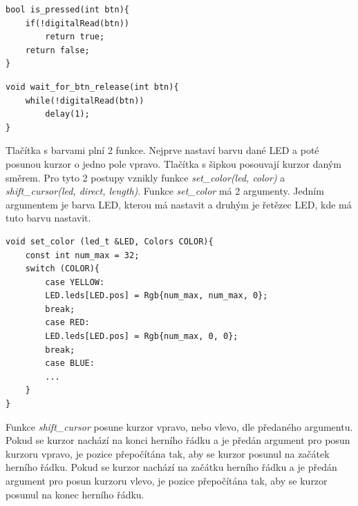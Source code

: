 \begin{minipage}{\linewidth}
\begin{lstlisting}[frame=single,numbers=right,caption={Funkce pro detekci stisku tlačítka.},label=lst:priklad.vypis.kodu.C,basicstyle=\ttfamily\small, keywordstyle=\color{black}\bfseries\underbar,]
bool is_pressed(int btn){
    if(!digitalRead(btn))
        return true;
    return false;
}
\end{lstlisting}
\end{minipage}

\begin{minipage}{\linewidth}
\begin{lstlisting}[frame=single,numbers=right,caption={Funkce čekající na puštění tlačítka.},label=lst:priklad.vypis.kodu.C,basicstyle=\ttfamily\small, keywordstyle=\color{black}\bfseries\underbar,]
void wait_for_btn_release(int btn){
    while(!digitalRead(btn))
        delay(1);
}
\end{lstlisting}
\end{minipage} 

Tlačítka s barvami plní 2 funkce. Nejprve nastaví barvu dané LED a poté posunou kurzor o jedno pole vpravo. Tlačítka s šipkou posouvají kurzor daným směrem. 
Pro tyto 2 postupy vznikly funkce {\it set\_color(led, color)} a {\it shift\_cursor(led, direct, length)}.
Funkce {\it set\_color} má 2 argumenty. Jedním argumentem je barva LED, kterou má nastavit a druhým je řetězec LED, kde má tuto barvu nastavit.

\begin{minipage}{\linewidth}
\begin{lstlisting}[frame=single,numbers=right,caption={Ukázka funkce nastavující barvu inteligentním LED.},label=lst:priklad.vypis.kodu.C,basicstyle=\ttfamily\small, keywordstyle=\color{black}\bfseries\underbar,]
void set_color (led_t &LED, Colors COLOR){
    const int num_max = 32;
    switch (COLOR){
        case YELLOW:
        LED.leds[LED.pos] = Rgb{num_max, num_max, 0}; 
        break;
        case RED:
        LED.leds[LED.pos] = Rgb{num_max, 0, 0}; 
        break;
        case BLUE:
        ...
    } 
}    
\end{lstlisting}
\end{minipage} 

Funkce {\it shift\_cursor} posune kurzor vpravo, nebo vlevo, dle předaného argumentu. Pokud se kurzor nachází na konci herního řádku a je předán 
argument pro posun kurzoru vpravo, je pozice přepočítána tak, aby se kurzor posunul na začátek herního řádku. Pokud se kurzor nachází na začátku herního 
řádku a je předán argument pro posun kurzoru vlevo, je pozice přepočítána tak, aby se kurzor posunul na konec herního řádku. 

